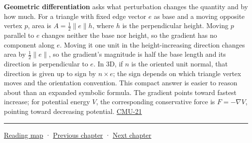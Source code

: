 \textbf{Geometric differentiation} asks what perturbation changes the quantity and by how much. For a triangle with fixed edge vector \(e\) as base and a moving opposite vertex \(p\), area is \(A=\tfrac12\|e\|h\), where \(h\) is the perpendicular height. Moving \(p\) parallel to \(e\) changes neither the base nor height, so the gradient has no component along \(e\). Moving it one unit in the height-increasing direction changes area by \(\tfrac12\|e\|\), so the gradient's magnitude is half the base length and its direction is perpendicular to \(e\). In 3D, if \(n\) is the oriented unit normal, that direction is given up to sign by \(n\times e\); the sign depends on which triangle vertex moves and the orientation convention. This compact answer is easier to reason about than an expanded symbolic formula. The gradient points toward fastest increase; for potential energy \(V\), the corresponding conservative force is \(F=-\nabla V\), pointing toward decreasing potential. \hyperref[04-visual-computing-ii-ch036]{CMU-21}

\begin{center}\rule{0.5\linewidth}{0.5pt}\end{center}

\href{Chapter\%20Edition/02\%20-\%20Graphics\%20Vision\%20and\%20XR/00\%20-\%20Reading\%20Map}{Reading map} · \hyperref[04-visual-computing-ii-ch028]{Previous chapter} · \hyperref[04-visual-computing-ii-ch030]{Next chapter}
